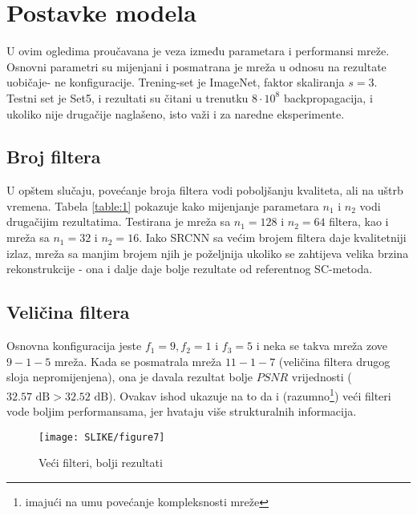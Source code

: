 \documentclass[12pt]{report}
\numberwithin{equation}{section}
\begin{document}
     
  
 
  \section{Postavke modela}
   
   U ovim ogledima proučavana je veza između parametara i performansi mreže. Osnovni parametri su mijenjani i posmatrana je mreža u odnosu na rezultate uobičaje-
ne konfiguracije. Trening-set je ImageNet, faktor skaliranja $s=3$. Testni set je Set5, i rezultati su čitani u trenutku $8 \cdot 10^8$ backpropagacija, i ukoliko nije drugačije naglašeno, isto važi i za naredne eksperimente.


  \subsection{Broj filtera}
  
   U opštem slučaju, povećanje broja filtera vodi poboljšanju kvaliteta, ali na uštrb vremena. Tabela \ref{table:1}
pokazuje kako mijenjanje parametara $n_1$ i $n_2$ vodi drugačijim rezultatima. Testirana je mreža sa $n_1=128$ i $n_2=64$ filtera, kao i mreža sa $n_1=32$ i $n_2=16$. Iako SRCNN sa većim brojem filtera daje kvalitetniji izlaz, mreža sa manjim brojem njih je poželjnija ukoliko se zahtijeva velika brzina rekonstrukcije - ona i dalje daje bolje rezultate od referentnog SC-metoda.  
   
  \subsection{Veličina filtera}
   
  Osnovna konfiguracija jeste $f_1=9, f_2=1$ i $f_3=5$ i neka se takva  mreža zove $9-1-5$ mreža. Kada se posmatrala mreža $11-1-7$ (veličina filtera drugog sloja nepromijenjena), ona je davala rezultat bolje $PSNR$ vrijednosti ($32.57 \text{ dB} > 32.52 \text{ dB}$). Ovakav ishod ukazuje na to da i (razumno\footnote{imajući na umu povećanje kompleksnosti mreže}) veći filteri vode boljim performansama, jer hvataju više strukturalnih informacija. 

\begin{wrapfigure}{r}{0.55\textwidth}
\vspace{-20pt}  
  \begin{center}
    \texttt{[image: SLIKE/figure7]}
  \end{center}
  \vspace{-20pt}
  \caption{Veći filteri, bolji rezultati}
  \vspace{-20pt}
  \label{fig:fsize}
\end{wrapfigure}  
  
\end{document}

